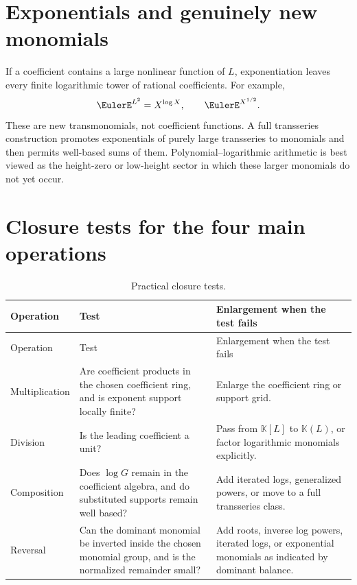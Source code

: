 \documentclass[11pt,openany]{book}
\theoremstyle{definition}
\theoremstyle{plain}
\theoremstyle{remark}
\newcommand{\K}{\mathbb{K}}
\begin{document}
\section{Exponentials and genuinely new monomials}
If a coefficient contains a large nonlinear function of \(L\), exponentiation
leaves every finite logarithmic tower of rational coefficients.  For example,
\[
 \EulerE^{L^2}=X^{\log X},
 \qquad
 \EulerE^{X^{1/2}}.
\]
These are new transmonomials, not coefficient functions.  A full transseries
construction promotes exponentials of purely large transseries to monomials and
then permits well-based sums of them.  Polynomial--logarithmic arithmetic is
best viewed as the height-zero or low-height sector in which these larger
monomials do not yet occur.

\section{Closure tests for the four main operations}
\begin{longtable}{@{}p{}p{}p{}@{}}
\caption{Practical closure tests.}\label{tab:closure-tests}\\
\toprule
Operation & Test & Enlargement when the test fails \\
\midrule
\endfirsthead
\toprule
Operation & Test & Enlargement when the test fails \\
\midrule
\endhead
Multiplication & Are coefficient products in the chosen coefficient ring, and
is exponent support locally finite? & Enlarge the coefficient ring or support
grid. \\
\addlinespace
Division & Is the leading coefficient a unit? & Pass from \(\K[L]\) to
\(\K(L)\), or factor logarithmic monomials explicitly. \\
\addlinespace
Composition & Does \(\log G\) remain in the coefficient algebra, and do
substituted supports remain well based? & Add iterated logs, generalized powers,
or move to a full transseries class. \\
\addlinespace
Reversal & Can the dominant monomial be inverted inside the chosen monomial
group, and is the normalized remainder small? & Add roots, inverse log powers,
iterated logs, or exponential monomials as indicated by dominant balance. \\
\bottomrule
\end{longtable}
\end{document}
